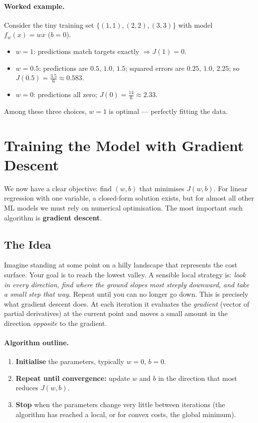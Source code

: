 \paragraph{Worked example.}
Consider the tiny training set $\{(1,1),(2,2),(3,3)\}$ with model
$f_w(x)=wx$ ($b=0$).

\begin{itemize}
\item $w=1$: predictions match targets exactly $\Rightarrow J(1)=0$.
\item $w=0.5$: predictions are $0.5,\,1.0,\,1.5$; squared errors are
  $0.25,\,1.0,\,2.25$; so $J(0.5)=\tfrac{3.5}{6}\approx0.583$.
\item $w=0$: predictions all zero; $J(0)=\tfrac{14}{6}\approx2.33$.
\end{itemize}

Among these three choices, $w=1$ is optimal — perfectly fitting the data.

\section{Training the Model with Gradient Descent}

We now have a clear objective: find $(w,b)$ that minimises $J(w,b)$. For linear
regression with one variable, a closed-form solution exists, but for almost all
other ML models we must rely on numerical optimisation. The most important such
algorithm is \textbf{gradient descent}.

\subsection{The Idea}

Imagine standing at some point on a hilly landscape that represents the cost
surface. Your goal is to reach the lowest valley. A sensible local strategy
is: \emph{look in every direction, find where the ground slopes most steeply
downward, and take a small step that way.} Repeat until you can no longer go
down. This is precisely what gradient descent does. At each iteration it
evaluates the \emph{gradient} (vector of partial derivatives) at the current
point and moves a small amount in the direction \emph{opposite} to the
gradient.

\paragraph{Algorithm outline.}
\begin{enumerate}
\item \textbf{Initialise} the parameters, typically $w=0$, $b=0$.
\item \textbf{Repeat until convergence:}
  update $w$ and $b$ in the direction that most reduces $J(w,b)$.
\item \textbf{Stop} when the parameters change very little between iterations
  (the algorithm has reached a local, or for convex costs, the global minimum).
\end{enumerate}

